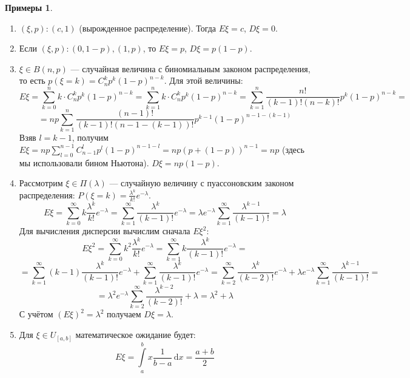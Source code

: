 \documentclass[11pt,openany,a4paper]{scrartcl}
\theoremstyle{plain}
\theoremstyle{definition}
\newtheorem{examples}[theorem]{Примеры}
\newcommand{\dif}{\, \mathrm d}
\begin{document}
\begin{examples}
\mbox{}
    \begin{enumerate}
        \item $(\xi, p): (c, 1)$ (вырожденное распределение). Тогда $E\xi = c$,
        $D\xi = 0$.
        \item Если $(\xi, p): (0, 1-p), (1, p)$, то $E\xi = p$, $D\xi = p(1-p)$.
        \item $\xi \in B(n, p)$ — случайная величина с биномиальным законом
        распределения, то есть $p(\xi = k) = C_n^kp^k(1-p)^{n-k}$. Для этой величины:
        $$
        E\xi = \sum\limits_{k=0}^n k\cdot C_n^kp^k(1-p)^{n-k} =
        \sum\limits_{k=1}^n k\cdot C_n^kp^k(1-p)^{n-k} =
        \sum\limits_{k=1}^n \frac{n!}{(k-1)!(n-k)!}p^k(1-p)^{n-k} =
        $$
        $$
        = np\sum\limits_{k=1}^n \frac{(n-1)!}{(k-1)!(n-1-(k-1))!}
        p^{k-1}(1-p)^{n-1-(k-1)}
        $$
        Взяв $l = k-1$, получим
        $E\xi = np\sum\limits_{l=0}^{n-1} C_{n-1}^l p^l(1-p)^{n-1 - l} =
        np(p + (1-p))^{n-1} = np$ (здесь мы использовали бином Ньютона).
        $D\xi = np(1-p)$.
        \item Рассмотрим $\xi \in \Pi(\lambda)$ — случайную величину с 
        пуассоновским законом распределения: $P(\xi = k) =
        \frac{\lambda^k}{k!}e^{-\lambda}$.
        $$E\xi = \sum\limits_{k=0}^\infty k\frac{\lambda^k}{k!}e^{-\lambda} =
        \sum\limits_{k=1}^\infty \frac{\lambda^k}{(k-1)!}e^{-\lambda} =
        \lambda e^{-\lambda}\sum\limits_{k=1}^\infty
        \frac{\lambda^{k-1}}{(k-1)!} =
        \lambda
        $$
        Для вычисления дисперсии вычислим сначала $E\xi^2$:
        $$
        E\xi^2 = \sum\limits_{k=0}^\infty k^2\frac{\lambda^k}{k!}e^{-\lambda} =
        \sum\limits_{k=1}^\infty k\frac{\lambda^k}{(k-1)!}e^{-\lambda} =
        $$
        $$
        = \sum\limits_{k=1}^\infty (k-1)\frac{\lambda^k}{(k-1)!}e^{-\lambda} +
        \sum\limits_{k=1}^\infty\frac{\lambda^k}{(k-1)!}e^{-\lambda} =
        \sum\limits_{k=2}^\infty \frac{\lambda^k}{(k-2)!}e^{-\lambda} +
        \lambda e^{-\lambda}
        \sum\limits_{k=1}^\infty \frac{\lambda^{k-1}}{(k-1)!} =
        $$
        $$
        = \lambda^2 e^{-\lambda}
        \sum\limits_{k=2}^\infty\frac{\lambda^{k-2}}{(k-2)!} + \lambda = \lambda^2 + \lambda
        $$
        С учётом $(E\xi)^2 = \lambda^2$ получаем $D\xi = \lambda$.
        \item Для $\xi \in U_{[a,b]}$ математическое ожидание будет:
        $$
        E\xi =
        \int\limits_a^b x\frac{1}{b-a}\dif x = \frac{a + b}{2}
        $$

\end{enumerate}
\end{examples}
\end{document}
